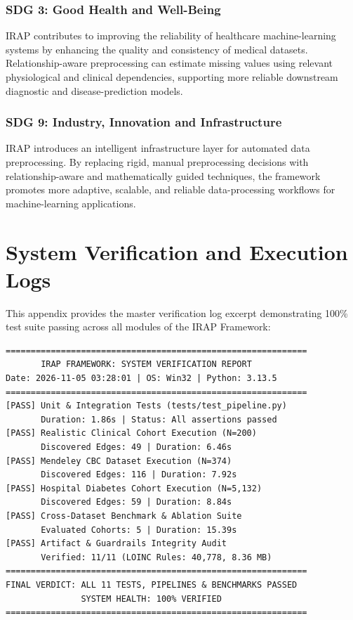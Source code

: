 \documentclass[MTech]{ugthesis}
\begin{document}
\begin{appendices}
\subsection*{SDG 3: Good Health and Well-Being}
IRAP contributes to improving the reliability of healthcare machine-learning systems by enhancing the quality and consistency of medical datasets. Relationship-aware preprocessing can estimate missing values using relevant physiological and clinical dependencies, supporting more reliable downstream diagnostic and disease-prediction models.

\subsection*{SDG 9: Industry, Innovation and Infrastructure}
IRAP introduces an intelligent infrastructure layer for automated data preprocessing. By replacing rigid, manual preprocessing decisions with relationship-aware and mathematically guided techniques, the framework promotes more adaptive, scalable, and reliable data-processing workflows for machine-learning applications.

\chapter{System Verification and Execution Logs}
This appendix provides the master verification log excerpt demonstrating 100\% test suite passing across all modules of the IRAP Framework:

\begin{singlespace}
{\footnotesize
\begin{verbatim}
============================================================
       IRAP FRAMEWORK: SYSTEM VERIFICATION REPORT          
Date: 2026-11-05 03:28:01 | OS: Win32 | Python: 3.13.5     
============================================================
[PASS] Unit & Integration Tests (tests/test_pipeline.py)
       Duration: 1.86s | Status: All assertions passed     
[PASS] Realistic Clinical Cohort Execution (N=200)         
       Discovered Edges: 49 | Duration: 6.46s              
[PASS] Mendeley CBC Dataset Execution (N=374)              
       Discovered Edges: 116 | Duration: 7.92s             
[PASS] Hospital Diabetes Cohort Execution (N=5,132)        
       Discovered Edges: 59 | Duration: 8.84s              
[PASS] Cross-Dataset Benchmark & Ablation Suite            
       Evaluated Cohorts: 5 | Duration: 15.39s             
[PASS] Artifact & Guardrails Integrity Audit               
       Verified: 11/11 (LOINC Rules: 40,778, 8.36 MB)      
============================================================
FINAL VERDICT: ALL 11 TESTS, PIPELINES & BENCHMARKS PASSED 
               SYSTEM HEALTH: 100% VERIFIED                
============================================================
\end{verbatim}
}
\end{singlespace}
\end{appendices}
\end{document}
